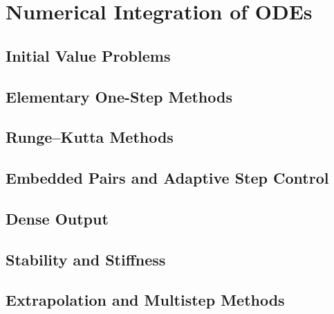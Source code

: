 \chapter{Numerical Integration of ODEs}\label{ch:ode-integration}

\section{Initial Value Problems}\label{sec:initial-value-problems}

\section{Elementary One-Step Methods}\label{sec:elementary-one-step-methods}

\section{Runge--Kutta Methods}\label{sec:runge-kutta-methods}

\section{Embedded Pairs and Adaptive Step Control}\label{sec:embedded-pairs-and-adaptive-step-control}

\section{Dense Output\optmark}\label{sec:dense-output}

\section{Stability and Stiffness\optmark}\label{sec:stability-and-stiffness}

\section{Extrapolation and Multistep Methods\optmark}\label{sec:extrapolation-and-multistep-methods}

